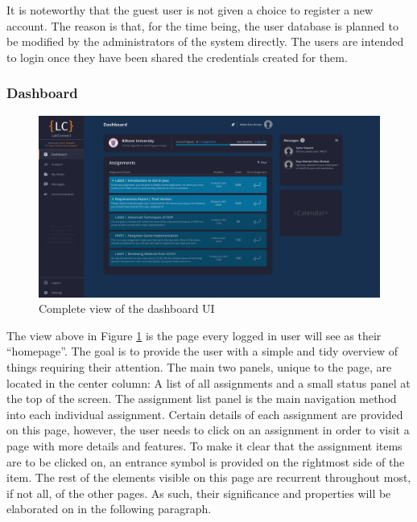 \documentclass[a4paper, 12pt]{article}
\begin{document}
    It is noteworthy that the guest user is not given a choice to register a new account.
    The reason is that, for the time being, the user database is planned to be modified by the administrators of the system directly.
    The users are intended to login once they have been shared the credentials created for them.
    
    \pagebreak
    
    \subsubsection{Dashboard}
    
    \begin{figure}[H]
        \centering
        \includegraphics[width=\textwidth]{main_dashboard}
        \caption{Complete view of the dashboard UI}
        \label{fig:dashboard_full}
    \end{figure}
    
    The view above in Figure \ref{fig:dashboard_full} is the page every logged in user will see as their ``homepage''.
    The goal is to provide the user with a simple and tidy overview of things requiring their attention.
    The main two panels, unique to the page, are located in the center column: A list of all assignments and a small
    status panel at the top of the screen. The assignment list panel is the main navigation method into each individual
    assignment. Certain details of each assignment are provided on this page, however, the user needs to click on an
    assignment in order to visit a page with more details and features. To make it clear that the assignment items are
    to be clicked on, an entrance symbol is provided on the rightmost side of the item.
    The rest of the elements visible on this page are recurrent throughout most, if not all, of the other pages.
    As such, their significance and properties will be elaborated on in the following paragraph.
    
\end{document}
